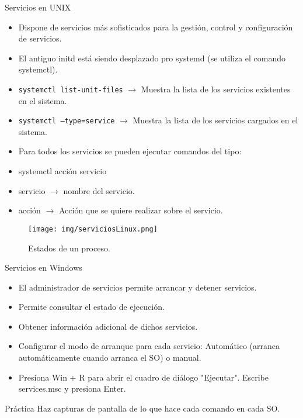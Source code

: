 \documentclass{beamer}
\begin{document}
\begin{frame}{Servicios en UNIX}
\begin{itemize}
\item Dispone de servicios más sofisticados para la gestión, control y
configuración de servicios.
\item El antiguo initd está siendo desplazado pro systemd (se utiliza el comando
systemctl).
\item \texttt{systemctl list-unit-files} $\to$ Muestra la lista de los servicios existentes en el sistema.
\item \texttt{systemctl –type=service} $\to$ Muestra la lista de los servicios cargados en el sistema.
\item Para todos los servicios se pueden ejecutar comandos del tipo:
\item systemctl acción servicio
\item servicio $\to$ nombre del servicio.
\item acción $\to$ Acción que se quiere realizar sobre el servicio.
\end{itemize}
\end{frame}

\begin{frame}
    \begin{figure}
        \centering
        \texttt{[image: img/serviciosLinux.png]} 
        \caption{Estados de un proceso.}
    \end{figure}
\end{frame}

\begin{frame}{Servicios en Windows}
    \begin{itemize}
        \item El administrador de servicios permite arrancar y detener servicios.
        \item Permite consultar el estado de ejecución.
        \item Obtener información adicional de dichos servicios.
        \item Configurar el modo de arranque para cada servicio: Automático (arranca automáticamente cuando arranca el SO) o manual.
        \item Presiona Win + R para abrir el cuadro de diálogo "Ejecutar". Escribe services.msc y presiona Enter.
    \end{itemize}
\end{frame}

\begin{frame}{Práctica}
\centering Haz capturas de pantalla de lo que hace cada comando en cada SO.
\end{frame}
\end{document}
